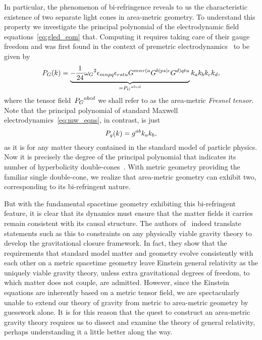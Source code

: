 In particular, the phenomenon of bi-refringence reveals to us the characteristic existence of two separate light cones in area-metric geometry. To understand this property we investigate the principal polynomial of the electrodynamic field equations~\eqref{eq:gled_eom} that. Computing it requires taking care of their gauge freedom and was first found in the context of premetric electrodynamics~\autocite{Rubilar2002,Rubilar2002a} to be given by
\begin{align}\label{eq:prpol_armet}
	P_G(k)=\underbrace{-\frac{1}{24}{\omega_G}^2\epsilon_{mnpq}\epsilon_{rstu}G^{mnr( a}G^{b| ps| c}G^{d) qtu}}_{={P_G}^{abcd}}k_ak_bk_ck_d
	\mathpunct{,}
\end{align}
where the tensor field~${P_G}^{abcd}$ we shall refer to as the area-metric \emph{Fresnel tensor}. Note that the principal polynomial of standard Maxwell electrodynamics~\eqref{eq:mw_eqns}, in contrast, is just
\begin{equation}
	P_g(k)=g^{ab}k_ak_b
	\mathpunct{,}
\end{equation}
as it is for any matter theory contained in the standard model of particle physics. Now it is precisely the degree of the principal polynomial that indicates its number of hyperbolicity double-cones~\autocite{DispRel2011}. With metric geometry providing the familiar single double-cone, we realize that area-metric geometry can exhibit two, corresponding to its bi-refringent nature.

But with the fundamental spacetime geometry exhibiting this bi-refringent feature, it is clear that its dynamics must ensure that the matter fields it carries remain consistent with its causal structure. The authors of~\autocite{Schuller2016} indeed translate statements such as this to constraints on any physically viable gravity theory to develop the gravitational closure framework. In fact, they show that the requirements that standard model matter and geometry evolve consistently with each other on a metric spacetime geometry leave Einstein general relativity as the uniquely viable gravity theory, unless extra gravitational degrees of freedom, to which matter does not couple, are admitted. However, since the Einstein equations are inherently based on a metric tensor field, we are spectacularly unable to extend our theory of gravity from metric to area-metric geometry by guesswork alone. It is for this reason that the quest to construct an area-metric gravity theory requires us to dissect and examine the theory of general relativity, perhaps understanding it a little better along the way.


